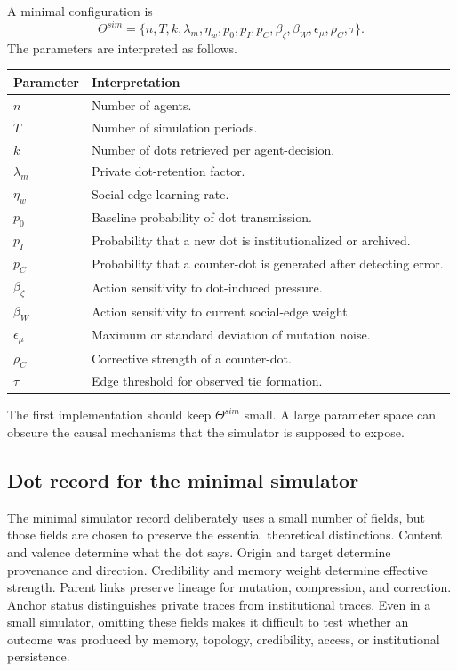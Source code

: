 \documentclass[11pt]{article}
\theoremstyle{remark}
\begin{document}
A minimal configuration is
$$
\Theta^{sim}=\{n,T,k,\lambda_m,\eta_w,p_0,p_I,p_C,\beta_\zeta,\beta_W,\epsilon_\mu,\rho_C,\tau\}.
$$
The parameters are interpreted as follows.

\begin{longtable}{L{0.18\textwidth}L{0.70\textwidth}}
\toprule
Parameter & Interpretation \\
\midrule
$n$ & Number of agents. \\
$T$ & Number of simulation periods. \\
$k$ & Number of dots retrieved per agent-decision. \\
$\lambda_m$ & Private dot-retention factor. \\
$\eta_w$ & Social-edge learning rate. \\
$p_0$ & Baseline probability of dot transmission. \\
$p_I$ & Probability that a new dot is institutionalized or archived. \\
$p_C$ & Probability that a counter-dot is generated after detecting error. \\
$\beta_\zeta$ & Action sensitivity to dot-induced pressure. \\
$\beta_W$ & Action sensitivity to current social-edge weight. \\
$\epsilon_\mu$ & Maximum or standard deviation of mutation noise. \\
$\rho_C$ & Corrective strength of a counter-dot. \\
$\tau$ & Edge threshold for observed tie formation. \\
\bottomrule
\end{longtable}

The first implementation should keep $\Theta^{sim}$ small. A large
parameter space can obscure the causal mechanisms that the simulator is
supposed to expose.

\subsection{Dot record for the minimal simulator}\label{minimal-dot-record}

The minimal simulator record deliberately uses a small number of fields, but those fields are chosen to preserve the essential theoretical distinctions. Content and valence determine what the dot says. Origin and target determine provenance and direction. Credibility and memory weight determine effective strength. Parent links preserve lineage for mutation, compression, and correction. Anchor status distinguishes private traces from institutional traces. Even in a small simulator, omitting these fields makes it difficult to test whether an outcome was produced by memory, topology, credibility, access, or institutional persistence.
\end{document}
